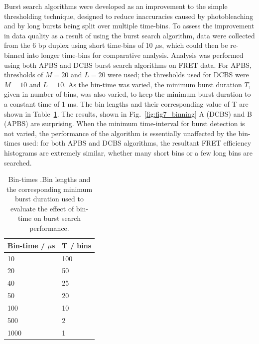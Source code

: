 Burst search algorithms were developed as an improvement to the simple thresholding technique, designed to reduce inaccuracies caused by photobleaching and by long bursts being split over multiple time-bins. To assess the improvement in data quality as a result of using the burst search algorithm, data were collected from the 6 bp duplex using short time-bins of 10 $\mu$s, which could then be re-binned into longer time-bins for comparative analysis. Analysis was performed using both APBS and DCBS burst search algorithms on FRET data. For APBS, thresholds of $M=20$ and $L=20$ were used; the thresholds used for DCBS were $M = 10$ and $L = 10$. As the bin-time was varied, the minimum burst duration $T$, given in number of bins, was also varied, to keep the minimum burst duration to a constant time of 1 ms. The bin lengths and their corresponding value of T are shown in Table~\ref{tab:bin-times}. The results, shown in Fig.~\ref{fig:fig7_binning} A (DCBS) and B (APBS) are surprising. When the minimum time-interval for burst detection is not varied, the performance of the algorithm is essentially unaffected by the bin-times used: for both APBS and DCBS algorithms, the resultant FRET efficiency histograms are extremely similar, whether many short bins or a few long bins are searched.


\begin{table}[!ht]
\caption{Bin-times .Bin lengths and the corresponding minimum burst duration used to evaluate the effect of bin-time on burst search performance.}
\begin{tabular}{|l|l|}
\hline
Bin-time / $\mu$s & T / bins \\
\hline
10 & 100 \\
20 & 50 \\
40 & 25 \\
50 & 20 \\
100 & 10 \\
500 & 2 \\
1000 & 1\\
\hline
\end{tabular}

\label{tab:bin-times}
\end{table}

